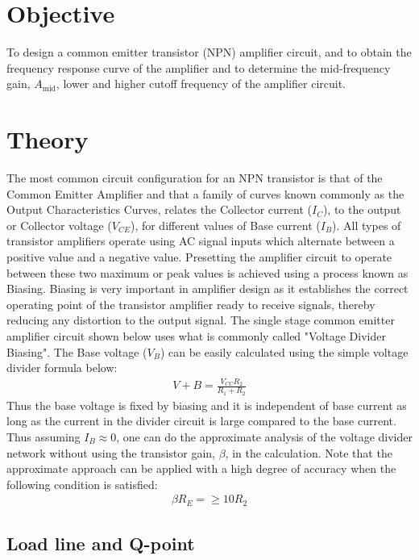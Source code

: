 \section{Objective}

To design a common emitter transistor (NPN) amplifier circuit, and to obtain the frequency response curve of the amplifier and to determine the mid-frequency gain, $A_\text{mid}$, lower and higher cutoff frequency of the amplifier circuit.

\section{Theory}
The most common circuit configuration for an NPN transistor is that of the Common
Emitter Amplifier and that a family of curves known commonly as the Output
Characteristics Curves, relates the Collector current ($I_C$), to the output or Collector
voltage ($V_{CE}$), for different values of Base current ($I_B$). All types of transistor amplifiers
operate using AC signal inputs which alternate between a positive value and a negative
value. Presetting the amplifier circuit to operate between these two maximum or peak
values is achieved using a process known as Biasing. Biasing is very important in
amplifier design as it establishes the correct operating point of the transistor amplifier
ready to receive signals, thereby reducing any distortion to the output signal.
The single stage common emitter amplifier circuit shown below uses what is commonly
called "Voltage Divider Biasing". The Base voltage ($V_B$) can be easily calculated using
the simple voltage divider formula below:
\begin{align}
    V+B = \frac{V_{CC}R_2}{R_1+R_2}
\end{align}
Thus the base voltage is fixed by biasing and it is independent of base current as long as
the current in the divider circuit is large compared to the base current. Thus assuming $I_B \approx 0$, one can do the approximate analysis of the voltage divider network without using the
transistor gain, $\beta$, in the calculation. Note that the approximate approach can be applied
with a high degree of accuracy when the following condition is satisfied:
\begin{align}
    \beta R_E = \ge 10R_2
\end{align}

\subsection*{Load line and Q-point}

